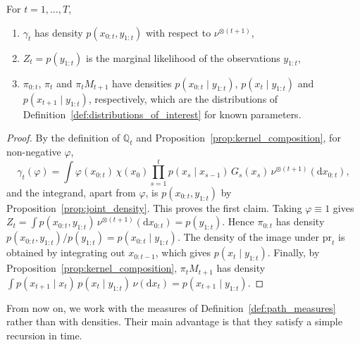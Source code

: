 \begin{proposition}
    \label{prop:path_measure_densities}
    For $t=1,\ldots,T$,
    \begin{enumerate}
        \item $\gamma_t$ has density $p(x_{0:t},y_{1:t})$ with respect to $\nu^{\otimes(t+1)}$,
        \item $Z_t = p(y_{1:t})$ is the marginal likelihood of the observations $y_{1:t}$,
        \item $\pi_{0:t}$, $\pi_t$ and $\pi_tM_{t+1}$ have densities $p(x_{0:t}\mid y_{1:t})$, $p(x_t\mid y_{1:t})$ and $p(x_{t+1}\mid y_{1:t})$, respectively, which are the distributions of Definition~\ref{def:distributions_of_interest} for known parameters.
    \end{enumerate}
\end{proposition}
\begin{proof}
    By the definition of $\mathbb{Q}_t$ and Proposition~\ref{prop:kernel_composition}, for non-negative $\varphi$,
    \begin{equation}
        \gamma_t(\varphi) = \int\varphi(x_{0:t})\,\chi(x_0)\prod_{s=1}^{t}p(x_s\mid x_{s-1})\,G_s(x_s)\,\nu^{\otimes(t+1)}(\mathrm{d}x_{0:t}),
    \end{equation}
    and the integrand, apart from $\varphi$, is $p(x_{0:t},y_{1:t})$ by Proposition~\ref{prop:joint_density}. This proves the first claim. Taking $\varphi\equiv1$ gives $Z_t = \int p(x_{0:t},y_{1:t})\,\nu^{\otimes(t+1)}(\mathrm{d}x_{0:t}) = p(y_{1:t})$. Hence $\pi_{0:t}$ has density $p(x_{0:t},y_{1:t})/p(y_{1:t}) = p(x_{0:t}\mid y_{1:t})$. The density of the image under $\mathrm{pr}_t$ is obtained by integrating out $x_{0:t-1}$, which gives $p(x_t\mid y_{1:t})$. Finally, by Proposition~\ref{prop:kernel_composition}, $\pi_tM_{t+1}$ has density $\int p(x_{t+1}\mid x_t)\,p(x_t\mid y_{1:t})\,\nu(\mathrm{d}x_t) = p(x_{t+1}\mid y_{1:t})$.
\end{proof}

From now on, we work with the measures of Definition~\ref{def:path_measures} rather than with densities. Their main advantage is that they satisfy a simple recursion in time.

